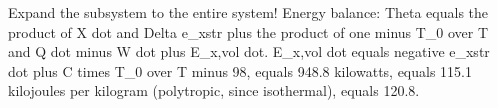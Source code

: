 Expand the subsystem to the entire system!
Energy balance: Theta equals the product of X dot and Delta e_xstr plus the product of one minus T_0 over T and Q dot minus W dot plus E_x,vol dot.
E_x,vol dot equals negative e_xstr dot plus C times T_0 over T minus 98, equals 948.8 kilowatts, equals 115.1 kilojoules per kilogram (polytropic, since isothermal), equals 120.8.